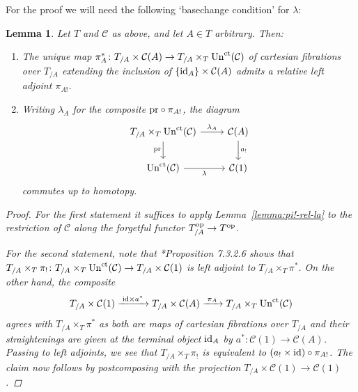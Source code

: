 \documentclass[reqno]{memo-l}
\theoremstyle{mythm}
\newtheorem{lemma}[thm]{Lemma}
\theoremstyle{definition}
\numberwithin{equation}{section}
\newcommand{\Cc}{{\mathcal{C}}}
\newcommand{\op}{{\textup{op}}}
\newcommand{\id}{\textup{id}}
\newcommand{\pr}{\textup{pr}}
\newcommand{\ct}{\textup{ct}}
\newcommand{\Un}{\textup{Un}}
\begin{document}
For the proof we will need the following `basechange condition' for $\lambda$:

\begin{lemma}\label{lemma:lambda-basechange}
    Let $T$ and $\Cc$ as above, and let $A\in T$ arbitrary. Then:
    \begin{enumerate}
        \item The unique map $\pi_A^*\colon T_{/A}\times\Cc(A)\to T_{/A}\times_T\Un^\ct(\Cc)$ of cartesian fibrations over $T_{/A}$ extending the inclusion of $\{\id_A\}\times\Cc(A)$ admits a relative left adjoint $\pi_{A!}$.
        \item Writing $\lambda_A$ for the composite $\pr\circ\pi_{A!}$, the diagram
        \[
            \begin{tikzcd}
               T_{/A}\times_T\Un^\ct(\Cc)\arrow[d,"\pr"']\arrow[r,"\lambda_A"]&\Cc(A)\arrow[d,"a_!"]\\
               \Un^\ct(\Cc)\arrow[r,"\lambda"'] & \Cc(1)
            \end{tikzcd}
        \]
        commutes up to homotopy.
    \end{enumerate}
    \begin{proof}
        For the first statement it suffices to apply Lemma~\ref{lemma:pi!-rel-la} to the restriction of $\Cc$ along the forgetful functor $T_{/A}^\op\to T^\op$. 
        
        For the second statement, note that \cite{HA}*{Proposition 7.3.2.6} shows that  $T_{/A}\times_T\pi_!\colon T_{/A}\times_T\Un^\ct(\Cc)\to T_{/A}\times\Cc(1)$ is left adjoint to $T_{/A}\times_T\pi^*$. On the other hand, the composite
        \[
            T_{/A}\times\Cc(1)\xrightarrow{\;\id\times a^*\;}T_{/A}\times\Cc(A)\xrightarrow{\;\pi_A\;}T_{/A}\times_T\Un^\ct(\Cc)
        \]
        agrees with $T_{/A}\times_T\pi^*$ as both are maps of cartesian fibrations over $T_{/A}$ and their straightenings are given at the terminal object $\id_A$ by $a^*\colon\Cc(1)\to\Cc(A)$. Passing to left adjoints, we see that $T_{/A}\times_T\pi_{!}$ is equivalent to $(a_!\times\id)\circ\pi_{A!}$. The claim now follows by postcomposing with the projection $T_{/A}\times\Cc(1)\to\Cc(1)$.
    \end{proof}
\end{lemma}
\end{document}
